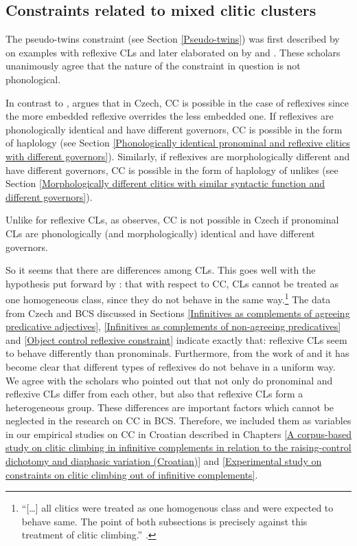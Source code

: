 \subsection{Constraints related to mixed clitic clusters}
\label{Constraints related to mixed clitic clusters:summary}

The pseudo-twins constraint (see Section \ref{Pseudo-twins}) was first described by \citet{Junghanns02} on examples with reflexive CLs and later elaborated on by \citet{Hana07} and \citet{Rosen14}. These scholars unanimously agree that the nature of the constraint in question is not phonological. 

In contrast to \citet{Junghanns02}, \citet{Rosen14} argues that in Czech, CC is possible in the case of reflexives since the more embedded reflexive overrides the less embedded one. If reflexives are phonologically identical and have different governors, CC is possible in the form of haplology (see Section \ref{Phonologically identical pronominal and reflexive clitics with different governors}). Similarly, if reflexives are morphologically different and have different governors, CC is possible in the form of haplology of unlikes (see Section \ref{Morphologically different clitics with similar syntactic function and different governors}). 

 Unlike for reflexive CLs, as \citet{Hana07} observes, CC is not possible in Czech if pronominal CLs are phonologically (and morphologically) identical and have different governors.

 So it seems that there are differences among CLs. This goes well with the hypothesis put forward by \citet[82f]{Dotlacil04}: that with respect to CC, CLs cannot be treated as one homogeneous class, since they do not behave in the same way.\footnote{“[\dots] all clitics were treated as one homogenous class and were expected to behave same. The point of both subsections is precisely against this treatment of clitic climbing.” \citep[82f]{Dotlacil04}.} The data from Czech and BCS discussed in Sections \ref{Infinitives as complements of agreeing predicative adjectives}, \ref{Infinitives as complements of non-agreeing predicatives} and \ref{Object control reflexive constraint} indicate exactly that: reflexive CLs seem to behave differently than pronominals. Furthermore, from the work of \citet{LesnerovaMalink08} and \citet{Rosen14} it has become clear that different types of reflexives do not behave in a uniform way. We agree with the scholars who pointed out that not only do pronominal and reflexive CLs differ from each other, but also that reflexive CLs form a heterogeneous group. These differences are important factors which cannot be neglected in the research on CC in BCS. Therefore, we included them as variables in our empirical studies on CC in Croatian described in Chapters \ref{A corpus-based study on clitic climbing in infinitive complements in relation to the raising-control dichotomy and diaphasic variation (Croatian)} and \ref{Experimental study on constraints on clitic climbing out of infinitive complements}.

